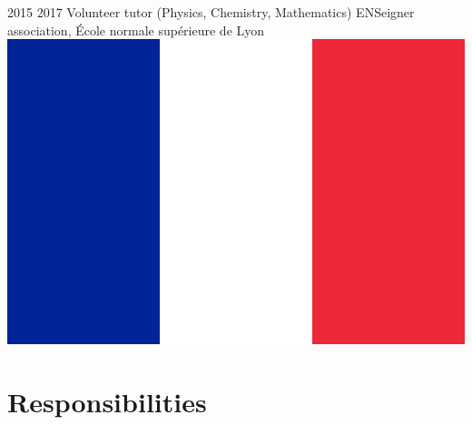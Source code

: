 \documentclass[a4paper]{cvtemplate_en} %
\begin{document}
\begin{cvbody}

\cvitem
	{2015}
	{2017}
	{Volunteer tutor (Physics, Chemistry, Mathematics)}
	{ENSeigner association, \'Ecole normale sup\'erieure de Lyon \includegraphics[height=0.8\myheight]{fr}}
	{}{}{}
	{}
	{\vspace{5pt}
	}

\end{cvbody}


\section{Responsibilities}
\end{document}

